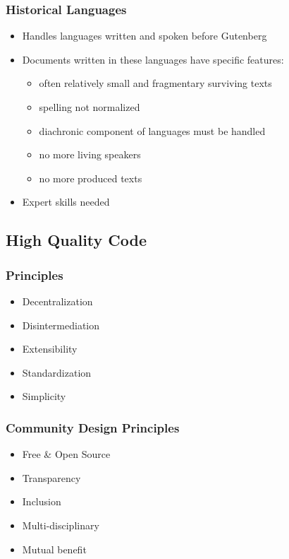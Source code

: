 \documentclass{beamer}
\begin{document}
\begin{frame}
\frametitle{Historical Languages}
\begin{itemize}
    \item Handles languages written and spoken before Gutenberg
    \item Documents written in these languages have specific features:   
    \begin{itemize}
        \item often relatively small and fragmentary surviving texts
        \item spelling not normalized
        \item diachronic component of languages must be handled
        \item no more living speakers
        \item no more produced texts
        
    \end{itemize}
    \item Expert skills needed
\end{itemize}
\end{frame}


\subsection{High Quality Code}

\begin{frame}
\frametitle{Principles}
\begin{itemize}
    \item Decentralization
    \item Disintermediation
    \item Extensibility
    \item Standardization
    \item Simplicity
\end{itemize}{}
    
\end{frame}


\begin{frame}
\frametitle{Community Design Principles}
\begin{itemize}
    \item Free \& Open Source
    \item Transparency
    \item Inclusion
    \item Multi-disciplinary
    \item Mutual benefit
\end{itemize}
\end{frame}
\end{document}

